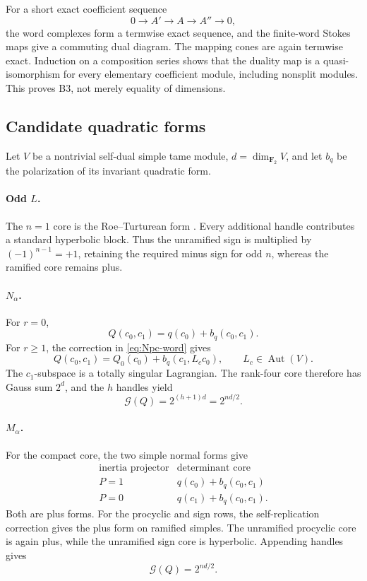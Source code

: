\documentclass[11pt,reqno]{amsart}
\theoremstyle{definition}
\theoremstyle{remark}
\numberwithin{equation}{section}
\newcommand{\F}{\mathbf F}
\newcommand{\Aut}{\operatorname{Aut}}
\newcommand{\Gsum}{\mathcal G}
\begin{document}
For a short exact coefficient sequence
\[
 0\longrightarrow A'\longrightarrow A\longrightarrow A''\longrightarrow0,
\]
the word complexes form a termwise exact sequence, and the finite-word
Stokes maps give a commuting dual diagram.  The mapping cones are again
termwise exact.  Induction on a composition series shows that the
duality map is a quasi-isomorphism for every elementary coefficient
module, including nonsplit modules.  This proves B3, not merely equality
of dimensions.

\subsection{Candidate quadratic forms}

Let \(V\) be a nontrivial self-dual simple tame module,
\(d=\dim_{\F_2}V\), and let \(b_q\) be the polarization of its invariant
quadratic form.

\paragraph{Odd \(L\).}
The \(n=1\) core is the Roe--Turturean form
\cite{RoeTurturean2026}.  Every additional handle contributes a standard
hyperbolic block.  Thus the unramified sign is multiplied by
\((-1)^{n-1}=+1\), retaining the required minus sign for odd \(n\),
whereas the ramified core remains plus.

\paragraph{\(N_\alpha\).}
For \(r=0\),
\[
 Q(c_0,c_1)=q(c_0)+b_q(c_0,c_1).
\]
For \(r\ge1\), the correction in \eqref{eq:Npc-word} gives
\[
 Q(c_0,c_1)=Q_0(c_0)+b_q(c_1,L_cc_0),
\qquad L_c\in\Aut(V).
\]
The \(c_1\)-subspace is a totally singular Lagrangian.  The rank-four
core therefore has Gauss sum \(2^d\), and the \(h\) handles yield
\[
 \Gsum(Q)=2^{(h+1)d}=2^{nd/2}.
\]

\paragraph{\(M_\alpha\).}
For the compact core, the two simple normal forms give
\[
\begin{array}{c|c}
 \text{inertia projector}&\text{determinant core}\\ \hline
 P=1&q(c_0)+b_q(c_0,c_1)\\
 P=0&q(c_1)+b_q(c_0,c_1).
\end{array}
\]
Both are plus forms.  For the procyclic and sign rows, the
self-replication correction gives the plus form on ramified simples.
The unramified procyclic core is again plus, while the unramified sign
core is hyperbolic.  Appending handles gives
\[
 \Gsum(Q)=2^{nd/2}.
\]
\end{document}

